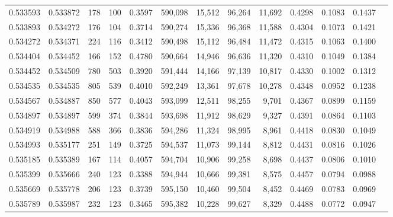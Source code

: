 \begin{tabular}{rrrrrrrrrrrrr}
0.533593 & 0.533872 &   178 &   100 &                                     0.3597 & 590,098 &  15,512 &  96,264 &  11,692 & 0.4298 & 0.1083 & 0.1437 \\
0.533893 & 0.534272 &   176 &   104 &                                     0.3714 & 590,274 &  15,336 &  96,368 &  11,588 & 0.4304 & 0.1073 & 0.1421 \\
0.534272 & 0.534371 &   224 &   116 &                                     0.3412 & 590,498 &  15,112 &  96,484 &  11,472 & 0.4315 & 0.1063 & 0.1400 \\
0.534404 & 0.534452 &   166 &   152 &                                     0.4780 & 590,664 &  14,946 &  96,636 &  11,320 & 0.4310 & 0.1049 & 0.1384 \\
0.534452 & 0.534509 &   780 &   503 &                                     0.3920 & 591,444 &  14,166 &  97,139 &  10,817 & 0.4330 & 0.1002 & 0.1312 \\
0.534535 & 0.534535 &   805 &   539 &                                     0.4010 & 592,249 &  13,361 &  97,678 &  10,278 & 0.4348 & 0.0952 & 0.1238 \\
0.534567 & 0.534887 &   850 &   577 &                                     0.4043 & 593,099 &  12,511 &  98,255 &   9,701 & 0.4367 & 0.0899 & 0.1159 \\
0.534897 & 0.534897 &   599 &   374 &                                     0.3844 & 593,698 &  11,912 &  98,629 &   9,327 & 0.4391 & 0.0864 & 0.1103 \\
0.534919 & 0.534988 &   588 &   366 &                                     0.3836 & 594,286 &  11,324 &  98,995 &   8,961 & 0.4418 & 0.0830 & 0.1049 \\
0.534993 & 0.535177 &   251 &   149 &                                     0.3725 & 594,537 &  11,073 &  99,144 &   8,812 & 0.4431 & 0.0816 & 0.1026 \\
0.535185 & 0.535389 &   167 &   114 &                                     0.4057 & 594,704 &  10,906 &  99,258 &   8,698 & 0.4437 & 0.0806 & 0.1010 \\
0.535399 & 0.535666 &   240 &   123 &                                     0.3388 & 594,944 &  10,666 &  99,381 &   8,575 & 0.4457 & 0.0794 & 0.0988 \\
0.535669 & 0.535778 &   206 &   123 &                                     0.3739 & 595,150 &  10,460 &  99,504 &   8,452 & 0.4469 & 0.0783 & 0.0969 \\
0.535789 & 0.535987 &   232 &   123 &                                     0.3465 & 595,382 &  10,228 &  99,627 &   8,329 & 0.4488 & 0.0772 & 0.0947 \\

\end{tabular}
